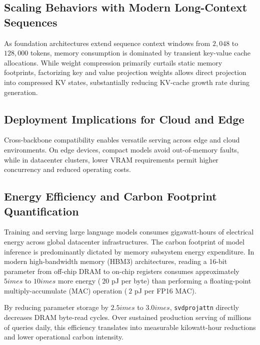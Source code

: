 \subsection{Scaling Behaviors with Modern Long-Context Sequences}
As foundation architectures extend sequence context windows from $2{,}048$ to $128{,}000$ tokens, memory consumption is dominated by transient key-value cache allocations. While weight compression primarily curtails static memory footprints, factorizing key and value projection weights allows direct projection into compressed KV states, substantially reducing KV-cache growth rate during generation.

\subsection{Deployment Implications for Cloud and Edge}
Cross-backbone compatibility enables versatile serving across edge and cloud environments. On edge devices, compact models avoid out-of-memory faults, while in datacenter clusters, lower VRAM requirements permit higher concurrency and reduced operating costs.

\subsection{Energy Efficiency and Carbon Footprint Quantification}
Training and serving large language models consumes gigawatt-hours of electrical energy across global datacenter infrastructures. The carbon footprint of model inference is predominantly dictated by memory subsystem energy expenditure. In modern high-bandwidth memory (HBM3) architectures, reading a 16-bit parameter from off-chip DRAM to on-chip registers consumes approximately $5	imes$ to $10	imes$ more energy ($~20$ pJ per byte) than performing a floating-point multiply-accumulate (MAC) operation ($~2$ pJ per FP16 MAC).

By reducing parameter storage by $2.5	imes$ to $3.0	imes$, \texttt{svdprojattn} directly decreases DRAM byte-read cycles. Over sustained production serving of millions of queries daily, this efficiency translates into measurable kilowatt-hour reductions and lower operational carbon intensity.
